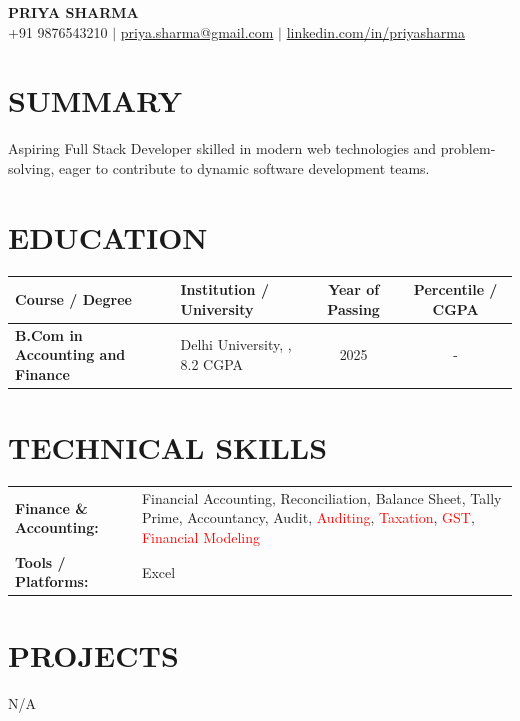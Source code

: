 \documentclass[8.5pt,a4paper]{extarticle}
\begin{document}
\begin{center}
{\large \textbf{PRIYA SHARMA}} \\ \vspace{1pt}
{\footnotesize +91 9876543210 \quad $|$ \quad \href{mailto:priya.sharma@gmail.com}{priya.sharma@gmail.com} \quad $|$ \quad \href{https://linkedin.com/in/priyasharma}{linkedin.com/in/priyasharma}}
\end{center}

\section*{SUMMARY}
{\small Aspiring Full Stack Developer skilled in modern web technologies and problem-solving, eager to contribute to dynamic software development teams.}

\section*{EDUCATION}
{\small {\small
\renewcommand{\arraystretch}{1.18}
\noindent\begin{tabularx}{\textwidth}{|p{1.7in}|X|c|c|}
\hline
\textbf{Course / Degree} & \textbf{Institution / University} & \textbf{Year of Passing} & \textbf{Percentile / CGPA} \\ \hline
\textbf{B.Com in Accounting and Finance} & Delhi University, , 8.2 CGPA & 2025 & - \\ \hline
\end{tabularx}
}\vspace{4pt}

}
\section*{TECHNICAL SKILLS}
\small
\begin{tabular}{@{}p{2.2in}p{5.1in}@{}}
\textbf{Finance \& Accounting:} & Financial Accounting, Reconciliation, Balance Sheet, Tally Prime, Accountancy, Audit, \textcolor{red}{Auditing}, \textcolor{red}{Taxation}, \textcolor{red}{GST}, \textcolor{red}{Financial Modeling} \\
\textbf{Tools / Platforms:} & Excel \\
\end{tabular}



\section*{PROJECTS}
{\small N/A

}
\end{document}
